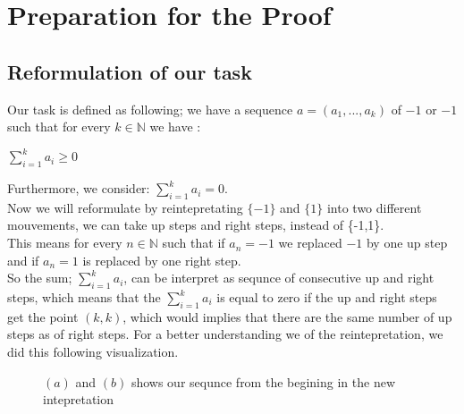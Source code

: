 \documentclass[a4paper,12pt,oneside]{article}
\begin{document}
\section{Preparation for the Proof}
\vspace{0.3cm}
\subsection{Reformulation of our task}
Our task is defined as following; we have a sequence $a=(a_{1},...,a_{k})$ of ${-1}$ or ${-1}$ such that for every $k\in\mathbb{N}$ we have : 
\begin{center}
$\sum_{i=1}^{k}a_{i}\geq0$
\end{center}
Furthermore, we consider: $\sum_{i=1}^{k}a_{i}=0$.
\\Now we will reformulate by reintepretating $\{-1\}$ and $\{1\}$ into two different mouvements, we can take up steps and right steps, instead of \{-1,1\}.\\This means for every $n\in\mathbb{N}$ such that if $a_{n}={-1}$ we replaced $-1$ by one up step and if $a_{n}={1}$ is replaced by one right step.
\\So the sum; $\sum_{i=1}^{k}a_{i}$, can be interpret as sequnce of consecutive up and right steps, which means that the  $\sum_{i=1}^{k}a_{i}$ is equal to zero if the up and right steps get the point $(k,k)$, which would implies that there are the same number of up steps as of right steps.
For a better understanding we of the reintepretation, we did this following visualization.
\begin{figure}[h]
\centering
    \hspace{0.3cm}
\caption{$(a)$ and $(b)$ shows our sequnce from the begining in the new intepretation}
\end{figure}
\newpage
\end{document}
